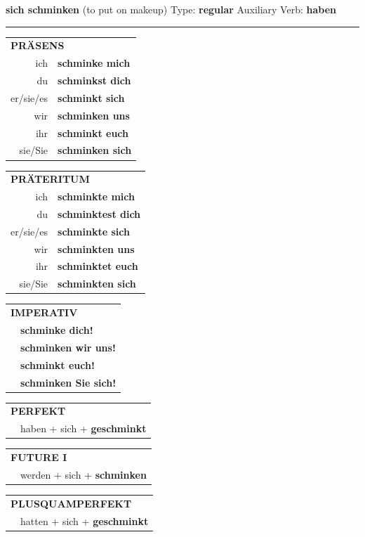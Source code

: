 \documentclass[10pt,a4paper]{revtex4-2}
\begin{document}
\begin{verbbox}
{\Large \bf sich schminken} (to put on makeup) \hfill Type: \textbf{regular} \hfill Auxiliary Verb: \textbf{haben}

\vspace{5pt}
\hrule
\vspace{5pt}

\begin{tabular}{rl}
\multicolumn{2}{l}{\textbf{PRÄSENS}}\\
ich & \textbf{schminke mich}\\
du & \textbf{schminkst dich}\\
er/sie/es & \textbf{schminkt sich}\\
wir & \textbf{schminken uns}\\
ihr & \textbf{schminkt euch}\\
sie/Sie & \textbf{schminken sich}\\
\end{tabular}
\hfill
\begin{tabular}{rl}
\multicolumn{2}{l}{\textbf{PRÄTERITUM}}\\
ich & \textbf{schminkte mich}\\
du & \textbf{schminktest dich}\\
er/sie/es & \textbf{schminkte sich}\\
wir & \textbf{schminkten uns}\\
ihr & \textbf{schminktet euch}\\
sie/Sie & \textbf{schminkten sich}\\
\end{tabular}
\hfill
\begin{tabular}{rl}
\multicolumn{2}{l}{\textbf{IMPERATIV}}\\
& \textbf{schminke dich!}\\
& \textbf{schminken wir uns!}\\
& \textbf{schminkt euch!}\\
& \textbf{schminken Sie sich!}\\
\end{tabular}

\vspace{10pt}

\begin{tabular}{rl}
\multicolumn{2}{l}{\textbf{PERFEKT}}\\
& haben + sich + \textbf{geschminkt}\\
\end{tabular}
\hfill
\begin{tabular}{rl}
\multicolumn{2}{l}{\textbf{FUTURE I}}\\
& werden + sich + \textbf{schminken}\\
\end{tabular}
\hfill
\begin{tabular}{rl}
\multicolumn{2}{l}{\textbf{PLUSQUAMPERFEKT}}\\
& hatten + sich + \textbf{geschminkt}\\
\end{tabular}


\end{verbbox}
\end{document}
